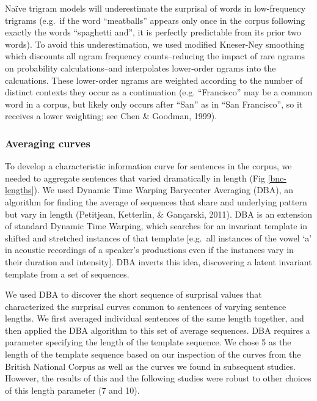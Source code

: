 \documentclass[10pt, letterpaper]{article}
\begin{document}
Naïve trigram models will underestimate the surprisal of words in
low-frequency trigrams (e.g.~if the word ``meatballs'' appears only once
in the corpus following exactly the words ``spaghetti and'', it is
perfectly predictable from its prior two words). To avoid this
underestimation, we used modified Kneser-Ney smoothing which discounts
all ngram frequency counts--reducing the impact of rare ngrams on
probability calculations--and interpolates lower-order ngrams into the
calcuations. These lower-order ngrams are weighted according to the
number of distinct contexts they occur as a continuation (e.g.
``Francisco'' may be a common word in a corpus, but likely only occurs
after ``San'' as in ``San Francisco'', so it receives a lower weighting;
see Chen \& Goodman, 1999).

\hypertarget{averaging-curves}{%
\subsubsection{Averaging curves}\label{averaging-curves}}

To develop a characteristic information curve for sentences in the
corpus, we needed to aggregate sentences that varied dramatically in
length (Fig \ref{bnc-lengths}). We used Dynamic Time Warping Barycenter
Averaging (DBA), an algorithm for finding the average of sequences that
share and underlying pattern but vary in length (Petitjean, Ketterlin,
\& Gançarski, 2011). DBA is an extension of standard Dynamic Time
Warping, which searches for an invariant template in shifted and
stretched instances of that template {[}e.g.~all instances of the vowel
`a' in acoustic recordings of a speaker's productions even if the
instances vary in their duration and intensity{]}. DBA inverts this
idea, discovering a latent invariant template from a set of sequences.

We used DBA to discover the short sequence of surprisal values that
characterized the surprisal curves common to sentences of varying
sentence lengths. We first averaged individual sentences of the same
length together, and then applied the DBA algorithm to this set of
average sequences. DBA requires a parameter specifying the length of the
template sequence. We chose 5 as the length of the template sequence
based on our inspection of the curves from the British National Corpus
as well as the curves we found in subsequent studies. However, the
results of this and the following studies were robust to other choices
of this length parameter (7 and 10).
\end{document}
